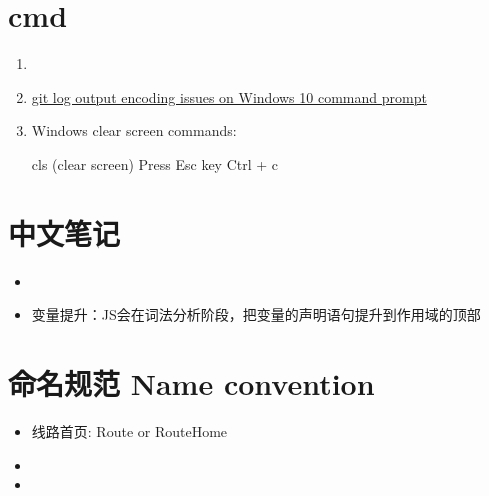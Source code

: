 \documentclass[a4paper, 12pt]{article}
\begin{document}
\section{cmd}
\begin{enumerate}

\item 

\item \href{https://stackoverflow.com/questions/41139067/git-log-output-encoding-issues-on-windows-10-command-prompt}{git log output encoding issues on Windows 10 command prompt}

\item Windows clear screen commands:

cls (clear screen) \quad Press Esc key \quad Ctrl + c

\end{enumerate}


\section{中文笔记}
\begin{itemize}

\item 


\item 变量提升：JS会在词法分析阶段，把变量的声明语句提升到作用域的顶部

\end{itemize}


\section{命名规范 Name convention}
\begin{itemize}
\item 线路首页: Route or RouteHome

\item 

\item 

\end{itemize}
\end{document}
